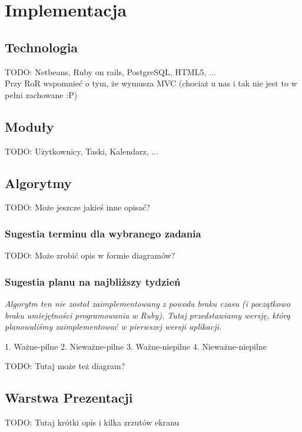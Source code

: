 \documentclass[pdflatex,11pt]{aghdpl}
\begin{document}
\chapter{Implementacja}

\section{Technologia}

TODO: Netbeans, Ruby on rails, PostgreSQL, HTML5, ...\\
Przy RoR wspomnieć o tym, że wymusza MVC (chociaż u nas i tak nie jest to w pełni zachowane :P)

\section{Moduły}

TODO: Użytkownicy, Taski, Kalendarz, ...

\section{Algorytmy}

TODO: Może jeszcze jakieś inne opisać?

\subsection{Sugestia terminu dla wybranego zadania}

TODO: Może zrobić opis w formie diagramów?

\subsection{Sugestia planu na najbliższy tydzień}
\label{sec:algPlanTygodniowy}

\textit{Algorytm ten nie został zaimplementowany z powodu braku czasu (i początkowo braku umiejętności programowania w Ruby). Tutaj przedstawiamy wersję, którą planowaliśmy zaimplementować w pierwszej wersji aplikacji.}

1. Ważne-pilne 2. Nieważne-pilne 3. Ważne-niepilne 4. Nieważne-niepilne

TODO: Tutaj może też diagram?

\section{Warstwa Prezentacji}

TODO: Tutaj krótki opis i kilka zrzutów ekranu
\end{document}
